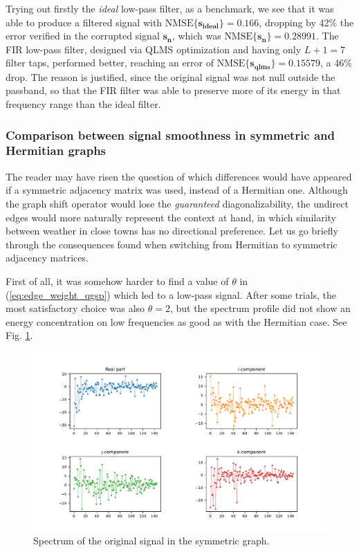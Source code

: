 Trying out firstly the \textit{ideal} low-pass filter, as a benchmark, we see that it was able to produce a filtered signal with $\text{NMSE}\{ \mathbf{s_{ideal}} \} = 0.166$, dropping by 42\% the error verified in the corrupted signal $\mathbf{s_n}$, which was $\text{NMSE}\{ \mathbf{s_n} \} = 0.28991$. The FIR low-pass filter, designed via QLMS optimization and having only $L+1 = 7$ filter taps, performed better, reaching an error of $\text{NMSE}\{ \mathbf{s_{qlms}} \} = 0.15579$, a 46\% drop. The reason is justified, since the original signal was not null outside the passband, so that the FIR filter was able to preserve more of its energy in that frequency range than the ideal filter.

\subsubsection{Comparison between signal smoothness in symmetric and Hermitian graphs}

The reader may have risen the question of which differences would have appeared if a symmetric adjacency matrix was used, instead of a Hermitian one. Although the graph shift operator would lose the \textit{guaranteed} diagonalizability, the undirect edges would more naturally represent the context at hand, in which similarity between weather in close towns has no directional preference. Let us go briefly through the consequences found when switching from Hermitian to symmetric adjacency matrices.

First of all, it was somehow harder to find a value of $\theta$ in (\ref{eq:edge_weight_qgsp}) which led to a low-pass signal. After some trials, the most satisfactory choice was also $\theta = 2$, but the spectrum profile did not show an energy concentration on low frequencies as good as with the Hermitian case. See Fig. \ref{fig:uk_spectrum_symmetric}.

\begin{figure}
    \centering
    \includegraphics[width=\linewidth]{Figures/uk_example/uk_spectrum_symmetric.pdf}
    \caption{Spectrum of the original signal in the symmetric graph.}
    \label{fig:uk_spectrum_symmetric}
\end{figure}

